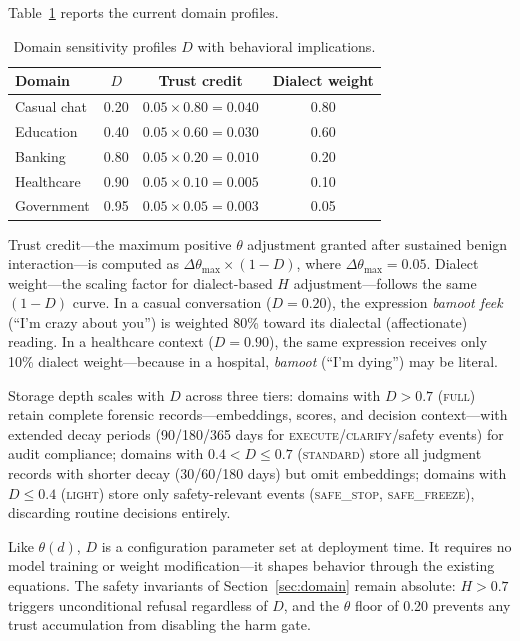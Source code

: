 \documentclass[11pt,a4paper]{article}
\begin{document}
Table~\ref{tab:domain_d} reports the current domain profiles.

\begin{table}[h]
\centering
\caption{Domain sensitivity profiles $D$ with behavioral implications.}
\label{tab:domain_d}
\begin{tabular}{lccc}
\toprule
Domain & $D$ & Trust credit & Dialect weight \\
\midrule
Casual chat & 0.20 & $0.05 \times 0.80 = 0.040$ & 0.80 \\
Education & 0.40 & $0.05 \times 0.60 = 0.030$ & 0.60 \\
Banking & 0.80 & $0.05 \times 0.20 = 0.010$ & 0.20 \\
Healthcare & 0.90 & $0.05 \times 0.10 = 0.005$ & 0.10 \\
Government & 0.95 & $0.05 \times 0.05 = 0.003$ & 0.05 \\
\bottomrule
\end{tabular}
\end{table}

\noindent Trust credit---the maximum positive $\theta$ adjustment granted after sustained benign interaction---is computed as $\Delta\theta_{\max} \times (1-D)$, where $\Delta\theta_{\max} = 0.05$. Dialect weight---the scaling factor for dialect-based $H$ adjustment---follows the same $(1-D)$ curve. In a casual conversation ($D = 0.20$), the expression \emph{bamoot feek} (``I'm crazy about you'') is weighted 80\% toward its dialectal (affectionate) reading. In a healthcare context ($D = 0.90$), the same expression receives only 10\% dialect weight---because in a hospital, \emph{bamoot} (``I'm dying'') may be literal.

Storage depth scales with $D$ across three tiers: domains with $D > 0.7$ (\textsc{full}) retain complete forensic records---embeddings, scores, and decision context---with extended decay periods (90/180/365 days for \textsc{execute}/\textsc{clarify}/safety events) for audit compliance; domains with $0.4 < D \leq 0.7$ (\textsc{standard}) store all judgment records with shorter decay (30/60/180 days) but omit embeddings; domains with $D \leq 0.4$ (\textsc{light}) store only safety-relevant events (\textsc{safe\_stop}, \textsc{safe\_freeze}), discarding routine decisions entirely.

Like $\theta(d)$, $D$ is a configuration parameter set at deployment time. It requires no model training or weight modification---it shapes behavior through the existing equations. The safety invariants of Section~\ref{sec:domain} remain absolute: $H > 0.7$ triggers unconditional refusal regardless of $D$, and the $\theta$ floor of 0.20 prevents any trust accumulation from disabling the harm gate.
\end{document}

